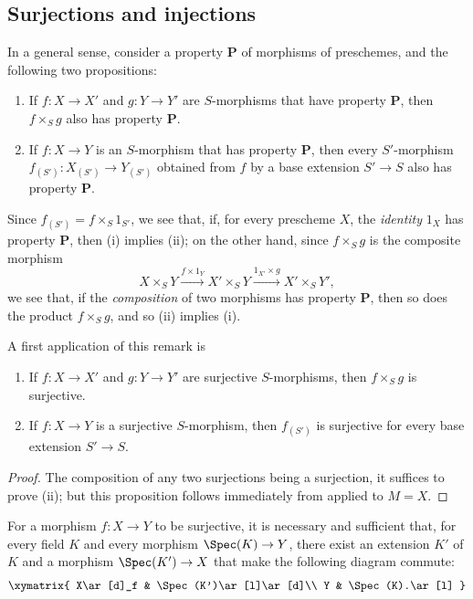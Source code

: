 \subsection{Surjections and injections}
\label{subsection:I.3.5}

\begin{env}[3.5.1]
\label{I.3.5.1}
In a general sense, consider a property $\textbf{P}$ of morphisms of preschemes, and the following two propositions:
\begin{enumerate}
  \item[(i)] If $f:X\to X'$ and $g:Y\to Y'$ are $S$-morphisms that have property $\textbf{P}$, then $f\times_S g$ also has property $\textbf{P}$.
  \item[(ii)] If $f:X\to Y$ is an $S$-morphism that has property $\textbf{P}$, then every $S'$-morphism $f_{(S')}:X_{(S')}\to Y_{(S')}$ obtained from $f$ by a base extension $S'\to S$ also has property $\textbf{P}$.
\end{enumerate}

Since $f_{(S')}=f\times_S 1_{S'}$, we see that, if, for every prescheme $X$, the \emph{identity} $1_X$ has property $\textbf{P}$, then (i) implies (ii); on the other hand, since $f\times_S g$ is the composite morphism
\[
  X\times_S Y\xrightarrow{f\times1_Y}X'\times_S Y\xrightarrow{1_{X'}\times g}X'\times_S Y',
\]
we see that, if the \emph{composition} of two morphisms has property $\textbf{P}$, then so does the product $f\times_S g$, and so (ii) implies (i).
\end{env}

A first application of this remark is
\begin{proposition}[3.5.2]
\label{I.3.5.2}
\medskip\noindent
\begin{enumerate}
  \item[{\rm(i)}] If $f:X\to X'$ and $g:Y\to Y'$ are surjective $S$-morphisms, then $f\times_S g$ is surjective.
  \item[{\rm(ii)}] If $f:X\to Y$ is a surjective $S$-morphism, then $f_{(S')}$ is surjective for every base extension $S'\to S$.
\end{enumerate}
\end{proposition}

\begin{proof}
The composition of any two surjections being a surjection, it suffices to prove (ii); but this proposition follows immediately from  applied to $M=X$.
\end{proof}

\begin{proposition}[3.5.3]
\label{I.3.5.3}
For a morphism $f:X\to Y$ to be surjective, it is necessary and sufficient that, for every field $K$ and every morphism $\Spec(K)\to Y$, there exist an extension $K'$ of $K$ and a morphism $\Spec(K')\to X$ that make the following diagram commute:
\[
  \xymatrix{
    X\ar[d]_f &
    \Spec(K')\ar[l]\ar[d]\\
    Y &
    \Spec(K).\ar[l]
  }
\]
\end{proposition}

